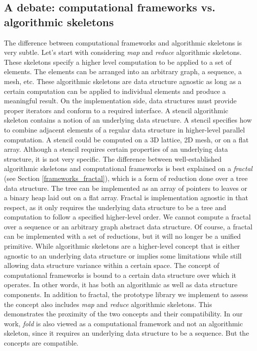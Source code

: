 \subsection{A debate: computational frameworks vs. algorithmic skeletons}
\label{background_frameworks_vs_skeletons}
\quad The difference between computational frameworks and algorithmic skeletons is very subtle. Let's start with considering \textit{map} and \textit{reduce} algorithmic skeletons. These skeletons specify a higher level computation to be applied to a set of elements. The elements can be arranged into an arbitrary graph, a sequence, a mesh, etc. These algorithmic skeletons are data structure agnostic as long as a certain computation can be applied to individual elements and produce a meaningful result. On the implementation side, data structures must provide proper iterators and conform to a required interface. A stencil algorithmic skeleton contains a notion of an underlying data structure. A stencil specifies how to combine adjacent elements of a regular data structure in higher-level parallel computation. A stencil could be computed on a 3D lattice, 2D mesh, or on a flat array. Although a stencil requires certain properties of an underlying data structure, it is not very specific.\newline\null
\quad The difference between well-established algorithmic skeletons and computational frameworks is best explained on a \textit{fractal} (see Section \ref{frameworks_fractal}), which is a form of reduction done over a tree data structure. The tree can be implemented as an array of pointers to leaves or a binary heap laid out on a flat array. Fractal is implementation agnostic in that respect, as it only requires the underlying data structure to be a tree and computation to follow a specified higher-level order. We cannot compute a fractal over a sequence or an arbitrary graph abstract data structure. Of course, a fractal can be implemented with a set of reductions, but it will no longer be a unified primitive.\newline\null
\quad While algorithmic skeletons are a higher-level concept that is either agnostic to an underlying data structure or implies some limitations while still allowing data structure variance within a certain space. The concept of computational frameworks is bound to a certain data structure over which it operates. In other words, it has both an algorithmic as well as data structure components.\newline\null
\quad In addition to fractal, the prototype library we implement to assess the concept also includes \textit{map} and \textit{reduce} algorithmic skeletons. This demonstrates the proximity of the two concepts and their compatibility. In our work, \textit{fold} is also viewed as a computational framework and not an algorithmic skeleton, since it requires an underlying data structure to be a sequence. But the concepts are compatible.
